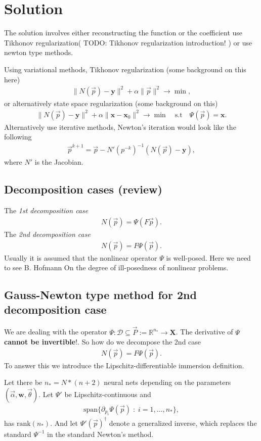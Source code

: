 \section{Solution}
The solution involves either reconstructing the function or the coefficient use
Tikhonov regularization( TODO: Tikhonov regularization introduction! ) or use
newton type methods.

Using variational methods, Tikhonov regularization (some background on this
here)
\begin{align}
    \|N(\vec{p}) - \mathbf{y}\|^{2} + \alpha \|\vec{p}\|^{2} \to \min,
\end{align}
or alternatively state space regularization (some background on this)
\begin{align}
    \|N(\vec{p}) - \mathbf{y}\|^{2}
    + \alpha \|\mathbf{x} - \mathbf{x}_0\|^{2}
    \to \min \quad \text{s.t} \quad \Psi(\vec{p}) = \mathbf{x}.
\end{align}
Alternatively use iterative methods, Newton's iteration would look like the
following
\begin{align}
    \vec{p}^{k+1} = \vec{p} - N'\left(p^{-k}\right)^{-1}\left(N(\vec{p}) -
    \mathbf{y}  \right),
\end{align}
where $N'$ is the Jacobian.
\subsection{Decomposition cases (review)}
The \textit{1st decomposition case}
\begin{align}
    N(\vec{p}) = \Psi(F\vec{p}).
\end{align}
The \textit{2nd decomposition case}
\begin{align}
    N(\vec{p}) = F\Psi(\vec{p}).
\end{align}
Usually it is assumed that the nonlinear operator $\Psi$ is well-posed.
Here we need to see B. Hofmann On the degree of ill-posedness of nonlinear
problems.
\subsection{Gauss-Newton type method for 2nd decomposition case}
We are dealing with the operator $\Psi:\mathcal{D} \subseteq \vec{P} :=
\mathbb{R}^{n_*} \to \mathbf{X}$. The derivative of $\Psi$ \textbf{cannot be
invertible}!. So how do we decompose the 2nd case
\begin{align}
    N(\vec{p}) = F\Psi(\vec{p}).
\end{align}
To answer this we introduce the Lipschitz-differentiable immersion
definition.
\begin{mydef}
    Let there be $n_* = N*(n+2)$ neural nets depending on the parameters
    $(\vec{\alpha}, \mathbf{w}, \vec{\theta})$. Let $\Psi'$ be
    Lipschitz-continuous and
    \begin{align}
        \text{span}\{\partial_{p_i}\Psi(\vec{p})\;:\;i=1,\ldots,n_*\},
    \end{align}
    has $\text{rank}(n_*)$.
    And let $\Psi'(\vec{p})^{\dagger}$ denote a generalized inverse,
    which replaces the standard $\Psi^{-1}$ in the standard Newton's method.
\end{mydef}
